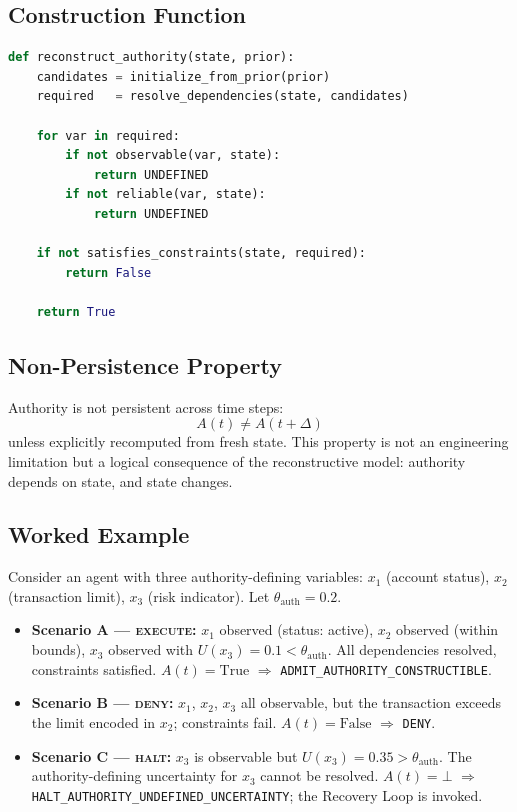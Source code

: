 \documentclass[11pt]{article}
\begin{document}
\subsection{Construction Function}

\begin{lstlisting}[language=Python, caption={Runtime authority construction}]
def reconstruct_authority(state, prior):
    candidates = initialize_from_prior(prior)
    required   = resolve_dependencies(state, candidates)

    for var in required:
        if not observable(var, state):
            return UNDEFINED
        if not reliable(var, state):
            return UNDEFINED

    if not satisfies_constraints(state, required):
        return False

    return True
\end{lstlisting}

\subsection{Non-Persistence Property}

Authority is not persistent across time steps:
\[
  A(t) \neq A(t + \Delta)
\]
unless explicitly recomputed from fresh state. This property is not an engineering
limitation but a logical consequence of the reconstructive model: authority depends on
state, and state changes.

\subsection{Worked Example}
\label{sec:worked-example}

Consider an agent with three authority-defining variables:
$x_1$ (account status), $x_2$ (transaction limit), $x_3$ (risk indicator).
Let $\theta_{\mathrm{auth}} = 0.2$.

\begin{itemize}
  \item \textbf{Scenario A — \textsc{execute}:} $x_1$ observed (status: active),
        $x_2$ observed (within bounds), $x_3$ observed with $U(x_3) = 0.1 <
        \theta_{\mathrm{auth}}$. All dependencies resolved, constraints satisfied.
        $A(t) = \mathrm{True}$ $\Rightarrow$ \texttt{ADMIT\_AUTHORITY\_CONSTRUCTIBLE}.

  \item \textbf{Scenario B — \textsc{deny}:} $x_1$, $x_2$, $x_3$ all observable,
        but the transaction exceeds the limit encoded in $x_2$; constraints fail.
        $A(t) = \mathrm{False}$ $\Rightarrow$ \texttt{DENY}.

  \item \textbf{Scenario C — \textsc{halt}:} $x_3$ is observable but
        $U(x_3) = 0.35 > \theta_{\mathrm{auth}}$. The authority-defining uncertainty
        for $x_3$ cannot be resolved. $A(t) = \bot$ $\Rightarrow$
        \texttt{HALT\_AUTHORITY\_UNDEFINED\_UNCERTAINTY}; the Recovery Loop is invoked.
\end{itemize}
\end{document}
